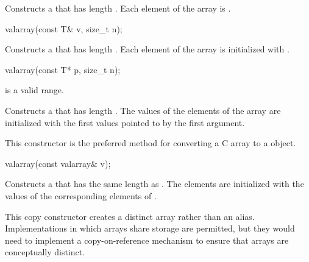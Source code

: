 \begin{itemdescr}
\pnum
\effects
Constructs a  that has length .
Each element of the array is .
\end{itemdescr}

%
\begin{itemdecl}
valarray(const T& v, size_t n);
\end{itemdecl}

\begin{itemdescr}
\pnum
\effects
Constructs a  that has length .
Each element of the array is initialized with .
\end{itemdescr}

%
\begin{itemdecl}
valarray(const T* p, size_t n);
\end{itemdecl}

\begin{itemdescr}

\pnum
\expects
{} is a valid range.

\effects
Constructs a  that has length .
The values of the elements of the array are initialized with the
first
values pointed to by the first argument.
\begin{footnote}
This constructor is the
preferred method for converting a C array to a
object.
\end{footnote}
\end{itemdescr}

%
\begin{itemdecl}
valarray(const valarray& v);
\end{itemdecl}

\begin{itemdescr}
\pnum
\effects
Constructs a  that has the same length as .
The elements are initialized with the values of the corresponding
elements of .
\begin{footnote}
This copy constructor creates
a distinct array rather than an alias.
Implementations in which arrays share storage are permitted, but they
would need to implement a copy-on-reference mechanism to ensure that arrays are
conceptually distinct.
\end{footnote}
\end{itemdescr}

